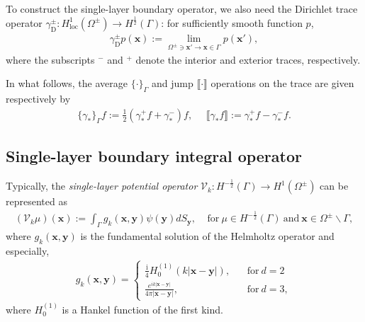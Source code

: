 To construct the single-layer boundary operator, we also need the Dirichlet trace operator 
$\gamma_{\text{D}}^{\pm}: H_{\text{loc}}^{1}(\Omega^{\pm})\rightarrow H^{\frac{1}{2}}(\Gamma)$: for sufficiently smooth function $p$,
\begin{align*}
    \gamma_{\text{D}}^{\pm}p(\boldsymbol{x}):=\lim_{\Omega^{\pm}\ni\boldsymbol{x'}\rightarrow\boldsymbol{x}\in\Gamma}p(\boldsymbol{x'}),
\end{align*}
where the subscripts $^{-}$ and $^{+}$ denote the interior and exterior traces, respectively. 

In what follows, the average $\{\cdot\}_{\Gamma}$ and jump $\llbracket \cdot \rrbracket$ operations on the trace are given respectively by
\begin{align*}
    \{\gamma_{*}\}_{\Gamma}f := \frac{1}{2}(\gamma_{*}^{+}f + \gamma_{*}^{-})f, \ \ \ \ \ \ \llbracket \gamma_{*}f \rrbracket := \gamma_{*}^{+}f - \gamma_{*}^{-}f.
\end{align*}

\subsection{Single-layer boundary integral operator}%
Typically, the \emph{single-layer potential operator} $\mathcal{V}_{k}: H^{-\frac{1}{2}}(\Gamma)\rightarrow H^{1}(\Omega^{\pm})$ can be represented as 
\begin{align*}
    (\mathcal{V}_{k}\mu)(\boldsymbol{x}) := \int_{\Gamma}g_{k}(\boldsymbol{x},\boldsymbol{y})\psi(\boldsymbol{y})dS_{\boldsymbol{y}}, \ \ \ \ \ 
    \text{for}\ \mu\in H^{-\frac{1}{2}}(\Gamma) \  \text{and} \ \boldsymbol{x}\in\Omega^{\pm}\backslash\Gamma,
\end{align*}
where $g_{k}(\boldsymbol{x},\boldsymbol{y})$ is the fundamental solution of the Helmholtz operator and especially,
\begin{align}\label{Green's function}
    g_{k}(\boldsymbol{x},\boldsymbol{y}) = \begin{cases}
          \frac{\mathrm{i}}{4}H_{0}^{(1)}(k|\boldsymbol{x}-\boldsymbol{y}|), \ \ \ \ &\text{for} \ d = 2\\
          \frac{e^{ik|\boldsymbol{x}-\boldsymbol{y}|}}{4\pi|\boldsymbol{x} - \boldsymbol{y}|}, \ \ \ \ &\text{for} \ d = 3,
        \end{cases}
\end{align}
where $H_{0}^{(1)}$ is a Hankel function of the first kind.

